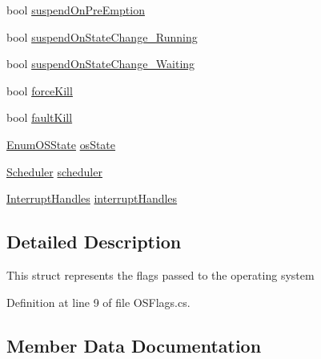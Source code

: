 \begin{DoxyCompactItemize}
\item 
bool \hyperlink{struct_c_p_u___o_s___simulator_1_1_operating___system_1_1_o_s_flags_a78836e63be936381215978ac392e1e60}{suspend\+On\+Pre\+Emption}
\item 
bool \hyperlink{struct_c_p_u___o_s___simulator_1_1_operating___system_1_1_o_s_flags_a828cad0b61448732b96162511e18352f}{suspend\+On\+State\+Change\+\_\+\+Running}
\item 
bool \hyperlink{struct_c_p_u___o_s___simulator_1_1_operating___system_1_1_o_s_flags_ac3439768b6e151e974a26a35ab0452a2}{suspend\+On\+State\+Change\+\_\+\+Waiting}
\item 
bool \hyperlink{struct_c_p_u___o_s___simulator_1_1_operating___system_1_1_o_s_flags_a36b9fca448bc8bc9d3fa51063b9efce5}{force\+Kill}
\item 
bool \hyperlink{struct_c_p_u___o_s___simulator_1_1_operating___system_1_1_o_s_flags_ab6e0543edd30b393255293bccf19c9d1}{fault\+Kill}
\item 
\hyperlink{namespace_c_p_u___o_s___simulator_1_1_operating___system_a03a98a403abc737c106a8f92db5bffc1}{Enum\+O\+S\+State} \hyperlink{struct_c_p_u___o_s___simulator_1_1_operating___system_1_1_o_s_flags_a7337260d7d298a9a195322b2bddb2102}{os\+State}
\item 
\hyperlink{class_c_p_u___o_s___simulator_1_1_operating___system_1_1_scheduler}{Scheduler} \hyperlink{struct_c_p_u___o_s___simulator_1_1_operating___system_1_1_o_s_flags_a4f93341c66d459dc18aaaad2df38b71d}{scheduler}
\item 
\hyperlink{class_c_p_u___o_s___simulator_1_1_c_p_u_1_1_interrupts_1_1_interrupt_handles}{Interrupt\+Handles} \hyperlink{struct_c_p_u___o_s___simulator_1_1_operating___system_1_1_o_s_flags_aaa66a35403429c68aacd46a14825f8c5}{interrupt\+Handles}
\end{DoxyCompactItemize}


\subsection{Detailed Description}
This struct represents the flags passed to the operating system 



Definition at line 9 of file O\+S\+Flags.\+cs.



\subsection{Member Data Documentation}
\hypertarget{struct_c_p_u___o_s___simulator_1_1_operating___system_1_1_o_s_flags_ac1d1812ad9ef56ccadacb19831d2e92d}{}
